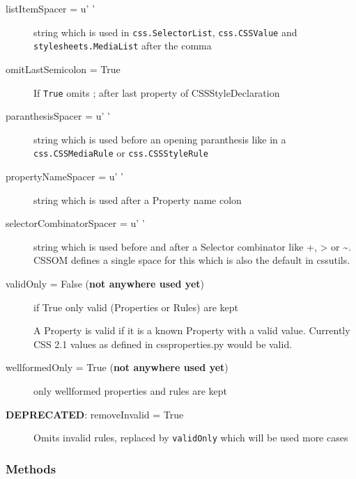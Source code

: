 \begin{description}
\item[{listItemSpacer = u' '}] \leavevmode 
string which is used in \texttt{css.SelectorList}, \texttt{css.CSSValue} and
\texttt{stylesheets.MediaList} after the comma

\item[{omitLastSemicolon = True}] \leavevmode 
If \texttt{True} omits ; after last property of CSSStyleDeclaration

\item[{paranthesisSpacer = u' '}] \leavevmode 
string which is used before an opening paranthesis like in a
\texttt{css.CSSMediaRule} or \texttt{css.CSSStyleRule}

\item[{propertyNameSpacer = u' '}] \leavevmode 
string which is used after a Property name colon

\item[{selectorCombinatorSpacer = u' '}] \leavevmode 
string which is used before and after a Selector combinator like +, {\textgreater} or {\textasciitilde}.
CSSOM defines a single space for this which is also the default in cssutils.

\item[{validOnly = False (\textbf{not anywhere used yet})}] \leavevmode 
if True only valid (Properties or Rules) are kept

A Property is valid if it is a known Property with a valid value.
Currently CSS 2.1 values as defined in cssproperties.py would be
valid.

\item[{wellformedOnly = True (\textbf{not anywhere used yet})}] \leavevmode 
only wellformed properties and rules are kept

\item[{\textbf{DEPRECATED}: removeInvalid = True}] \leavevmode 
Omits invalid rules, replaced by \texttt{validOnly} which will be used
more cases

\end{description}


  \subsubsection{Methods}

    \vspace{0.5ex}

